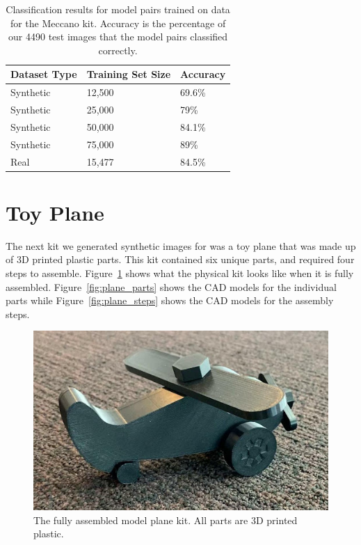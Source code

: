 \begin{table}
  \begin{tabular}{|l||l|l|}
    \hline
    Dataset Type & Training Set Size & Accuracy\\
    \hline
    \hline
    Synthetic & 12,500 & 69.6\%\\
    Synthetic & 25,000 & 79\%\\
    Synthetic & 50,000 & 84.1\%\\
    Synthetic & 75,000 & 89\%\\
    \hline
    Real & 15,477 & 84.5\%\\
    \hline
  \end{tabular}
  \caption[
  Classification results for model pairs trained on data for the Meccano kit
  ]{
    Classification results for model pairs trained on data for the Meccano kit.
    Accuracy is the percentage of our 4490 test images that the model pairs
    classified correctly.
  }\label{tab:meccano_accuracy}
\end{table}

\section{Toy Plane}

The next kit we generated synthetic images for was a toy plane that was made up
of 3D printed plastic parts.
This kit contained six unique parts, and required four steps to assemble.
Figure~\ref{fig:assembled_plane} shows what the physical kit looks like when it
is fully assembled.
Figure~\ref{fig:plane_parts} shows the CAD models for the individual parts while
Figure~\ref{fig:plane_steps} shows the CAD models for the assembly steps.

\begin{figure}
  \includegraphics[width=\columnwidth]{figures/synthetic/toy_plane.jpg}
  \caption[The fully assembled model plane kit]{
    The fully assembled model plane kit.
    All parts are 3D printed plastic.
  }\label{fig:assembled_plane}
\end{figure}

